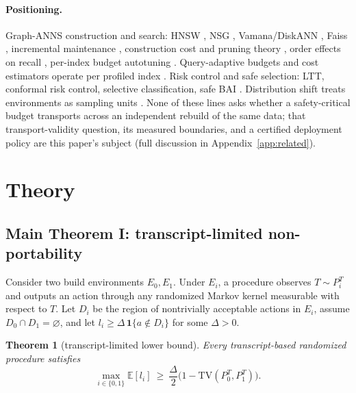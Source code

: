 \documentclass{article}
\newtheorem{theorem}{Theorem}
\newcommand{\TV}{\mathrm{TV}}
\newcommand{\E}{\mathbb{E}}
\begin{document}
\paragraph{Positioning.}
Graph-ANNS construction and search: HNSW \citep{malkov2020hnsw}, NSG \citep{fu2019nsg},
Vamana/DiskANN \citep{subramanya2019diskann}, Faiss \citep{johnson2021faiss}, incremental maintenance
\citep{xu2022maintenance}, construction cost and pruning theory \citep{prokhorenkova2020graph}, order
effects on recall \citep{elliott2024order}, per-index budget autotuning \citep{bae2026qbat}.
Query-adaptive budgets and cost estimators operate per profiled index
\citep{li2020learned,chatzakis2025darth,horchidan2025conann,wang2026annie,zhang2026exploration}. Risk
control and safe selection: LTT, conformal risk control, selective classification, safe BAI
\citep{angelopoulos2025ltt,bates2021rcps,angelopoulos2024crc,elyaniv2010selective,wang2022safebai,garivier2016bai}.
Distribution shift treats environments as sampling units
\citep{bendavid2010theory,johansson2019support,duchi2025multienv}. None of these lines asks whether a
safety-critical budget transports across an independent rebuild of the same data; that transport-validity
question, its measured boundaries, and a certified deployment policy are this paper's subject (full
discussion in Appendix~\ref{app:related}).

\section{Theory}
\label{sec:theory}

\subsection{Main Theorem I: transcript-limited non-portability}

Consider two build environments $E_0,E_1$. Under $E_i$, a procedure observes $T\sim P_i^{T}$ and outputs an
action through any randomized Markov kernel measurable with respect to $T$. Let $D_i$ be the region of
nontrivially acceptable actions in $E_i$, assume $D_0\cap D_1=\varnothing$, and let
$l_i\ge\Delta\,\mathbf{1}\{a\notin D_i\}$ for some $\Delta>0$.

\begin{theorem}[transcript-limited lower bound]
Every transcript-based randomized procedure satisfies
\begin{equation}
\max_{i\in\{0,1\}}\E[l_{i}]\ \ge\ \frac{\Delta}{2}\bigl(1-\TV(P_{0}^{T},P_{1}^{T})\bigr).
\label{eq:thm1}
\end{equation}
\end{theorem}
\end{document}
